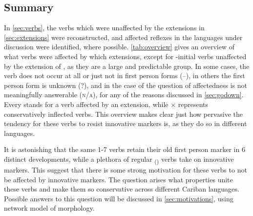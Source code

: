 \subsection{Summary}
\label{sec:verbsummary}
In \cref{sec:verbs}, the verbs which were unaffected by the extensions in \cref{sec:extensions} were reconstructed, and affected reflexes in the languages under discussion were identified, where possible.
\cref{tab:overview} gives an overview of what verbs were affected by which extensions, except for -initial \akuriyo verbs unaffected by the extension of , as they are a large and predictable group.
In some cases, the verb does not occur at all or just not in first person forms (–), in others the first person form is unknown (?), and in the case of  the question of affectedness is not meaningfully answerable (\textsc{n/a}), for any of the reasons discussed in \cref{sec:godown}.
Every \checkmark stands for a verb affected by an extension, while × represents conservatively inflected verbs.
This overview makes clear just how pervasive the tendency for these verbs to resist innovative markers is, as they do so in different languages.



It is astonishing that the same 1-7 verbs retain their old first person marker in 6 distinct developments, while a plethora of regular \textsubscript{()} verbs take on innovative markers.
This suggest that there is some strong motivation for these verbs to not be affected by innovative markers.
The question arises what properties unite these verbs and make them so conservative across different Cariban languages.
Possible answers to this question will be discussed in \cref{sec:motivations}, using  network model of morphology.